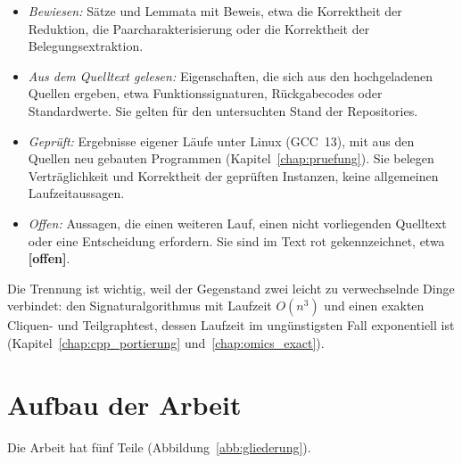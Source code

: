 \documentclass[a4paper,12pt,twoside]{report}
\DeclareRobustCommand{\_}{\textunderscore\allowbreak{}}
\theoremstyle{definition}
\newcommand{\offen}[1]{\textcolor{accentred}{\textbf{[#1]}}}
\begin{document}
\begin{itemize}
	\item \emph{Bewiesen:} Sätze und Lemmata mit Beweis, etwa die Korrektheit der Reduktion, die Paarcharakterisierung oder die Korrektheit der Belegungsextraktion.
	\item \emph{Aus dem Quelltext gelesen:} Eigenschaften, die sich aus den hochgeladenen Quellen ergeben, etwa Funktionssignaturen, Rückgabecodes oder Standardwerte. Sie gelten für den untersuchten Stand der Repositories.
	\item \emph{Geprüft:} Ergebnisse eigener Läufe unter Linux (GCC~13), mit aus den Quellen neu gebauten Programmen (Kapitel~\ref{chap:pruefung}). Sie belegen Verträglichkeit und Korrektheit der geprüften Instanzen, keine allgemeinen Laufzeitaussagen.
	\item \emph{Offen:} Aussagen, die einen weiteren Lauf, einen nicht vorliegenden Quelltext oder eine Entscheidung erfordern. Sie sind im Text rot gekennzeichnet, etwa \offen{offen}.
\end{itemize}
 
Die Trennung ist wichtig, weil der Gegenstand zwei leicht zu verwechselnde Dinge verbindet: den Signaturalgorithmus mit Laufzeit $O(n^3)$ und einen exakten Cliquen- und Teilgraphtest, dessen Laufzeit im ungünstigsten Fall exponentiell ist (Kapitel~\ref{chap:cpp_portierung} und~\ref{chap:omics_exact}).
 
\section{Aufbau der Arbeit}
 
Die Arbeit hat fünf Teile (Abbildung~\ref{abb:gliederung}).
 
\end{document}
